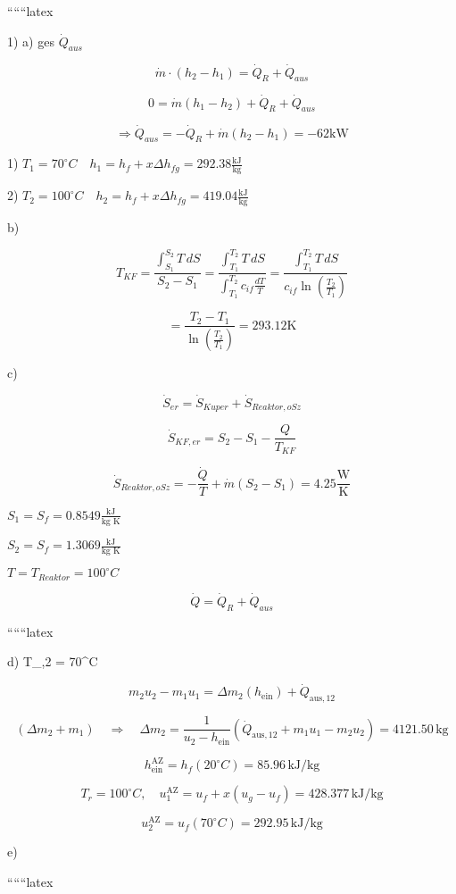 
``````latex

1) a) ges $\dot{Q}_{aus}$

\[
\dot{m} \cdot (h_2 - h_1) = \dot{Q}_R + \dot{Q}_{aus}
\]

\[
0 = \dot{m} (h_1 - h_2) + \dot{Q}_R + \dot{Q}_{aus}
\]

\[
\Rightarrow \dot{Q}_{aus} = -\dot{Q}_R + \dot{m} (h_2 - h_1) = -62 \text{kW}
\]

1) $T_1 = 70^\circ C \quad h_1 = h_f + x \Delta h_{fg} = 292.38 \frac{\text{kJ}}{\text{kg}}$

2) $T_2 = 100^\circ C \quad h_2 = h_f + x \Delta h_{fg} = 419.04 \frac{\text{kJ}}{\text{kg}}$

b)

\[
T_{KF} = \frac{\int_{S_1}^{S_2} T \, dS}{S_2 - S_1} = \frac{\int_{T_1}^{T_2} T \, dS}{\int_{T_1}^{T_2} c_{if} \frac{dT}{T}} = \frac{\int_{T_1}^{T_2} T \, dS}{c_{if} \ln \left( \frac{T_2}{T_1} \right)}
\]

\[
= \frac{T_2 - T_1}{\ln \left( \frac{T_2}{T_1} \right)} = 293.12 \text{K}
\]

c)

\[
\dot{S}_{er} = \dot{S}_{Kuper} + \dot{S}_{Reaktor, oSz}
\]

\[
\dot{S}_{KF, er} = S_2 - S_1 - \frac{Q}{T_{KF}}
\]

\[
\dot{S}_{Reaktor, oSz} = -\frac{\dot{Q}}{T} + \dot{m} (S_2 - S_1) = 4.25 \frac{\text{W}}{\text{K}}
\]

$S_1 = S_f = 0.8549 \frac{\text{kJ}}{\text{kg K}}$

$S_2 = S_f = 1.3069 \frac{\text{kJ}}{\text{kg K}}$

$T = T_{Reaktor} = 100^\circ C$

\[
\dot{Q} = \dot{Q}_R + \dot{Q}_{aus}
\]

``````latex


d) \quad T_{,2} = 70^\circ C

\[
m_2 u_2 - m_1 u_1 = \Delta m_2 (h_{\text{ein}}) + \dot{Q}_{\text{aus},12}
\]

\[
(\Delta m_2 + m_1) \quad \Rightarrow \quad \Delta m_2 = \frac{1}{u_2 - h_{\text{ein}}} (\dot{Q}_{\text{aus},12} + m_1 u_1 - m_2 u_2) = 4121.50 \, \text{kg}
\]

\[
h_{\text{ein}}^{\text{AZ}} = h_f (20^\circ C) = 85.96 \, \text{kJ/kg}
\]

\[
T_r = 100^\circ C, \quad u_1^{\text{AZ}} = u_f + x (u_g - u_f) = 428.377 \, \text{kJ/kg}
\]

\[
u_2^{\text{AZ}} = u_f (70^\circ C) = 292.95 \, \text{kJ/kg}
\]

e) \quad {}

``````latex


